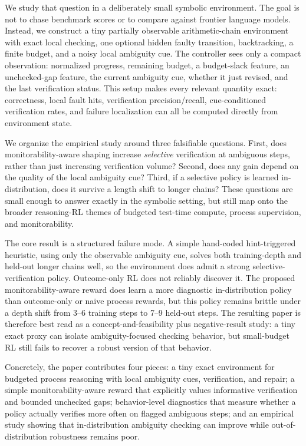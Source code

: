 \documentclass{article}
\begin{document}
We study that question in a deliberately small symbolic environment. The goal is not to chase benchmark scores or to compare against frontier language models. Instead, we construct a tiny partially observable arithmetic-chain environment with exact local checking, one optional hidden faulty transition, backtracking, a finite budget, and a noisy local ambiguity cue. The controller sees only a compact observation: normalized progress, remaining budget, a budget-slack feature, an unchecked-gap feature, the current ambiguity cue, whether it just revised, and the last verification status. This setup makes every relevant quantity exact: correctness, local fault hits, verification precision/recall, cue-conditioned verification rates, and failure localization can all be computed directly from environment state.

We organize the empirical study around three falsifiable questions. First, does monitorability-aware shaping increase \emph{selective} verification at ambiguous steps, rather than just increasing verification volume? Second, does any gain depend on the quality of the local ambiguity cue? Third, if a selective policy is learned in-distribution, does it survive a length shift to longer chains? These questions are small enough to answer exactly in the symbolic setting, but still map onto the broader reasoning-RL themes of budgeted test-time compute, process supervision, and monitorability.

The core result is a structured failure mode. A simple hand-coded hint-triggered heuristic, using only the observable ambiguity cue, solves both training-depth and held-out longer chains well, so the environment does admit a strong selective-verification policy. Outcome-only RL does not reliably discover it. The proposed monitorability-aware reward does learn a more diagnostic in-distribution policy than outcome-only or naive process rewards, but this policy remains brittle under a depth shift from 3--6 training steps to 7--9 held-out steps. The resulting paper is therefore best read as a concept-and-feasibility plus negative-result study: a tiny exact proxy can isolate ambiguity-focused checking behavior, but small-budget RL still fails to recover a robust version of that behavior.

Concretely, the paper contributes four pieces: a tiny exact environment for budgeted process reasoning with local ambiguity cues, verification, and repair; a simple monitorability-aware reward that explicitly values informative verification and bounded unchecked gaps; behavior-level diagnostics that measure whether a policy actually verifies more often on flagged ambiguous steps; and an empirical study showing that in-distribution ambiguity checking can improve while out-of-distribution robustness remains poor.
\end{document}
